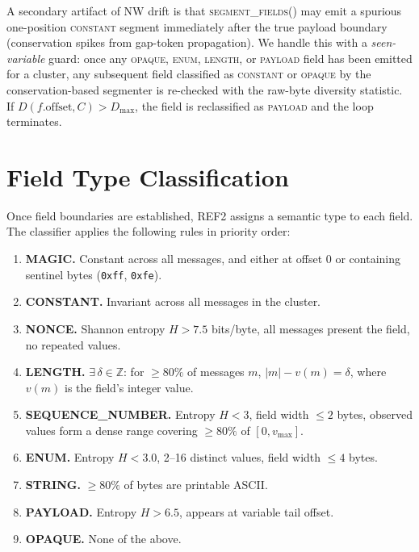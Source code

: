 \documentclass[letterpaper,twocolumn,10pt]{article}
\begin{document}
A secondary artifact of NW drift is that \textsc{segment\_fields()} may emit a
spurious one-position \textsc{constant} segment immediately after the true
payload boundary (conservation spikes from gap-token propagation).  We handle
this with a \emph{seen-variable} guard: once any \textsc{opaque},
\textsc{enum}, \textsc{length}, or \textsc{payload} field has been emitted for
a cluster, any subsequent field classified as \textsc{constant} or
\textsc{opaque} by the conservation-based segmenter is re-checked with the
raw-byte diversity statistic.  If $D(f.\text{offset}, C) > D_\text{max}$, the
field is reclassified as \textsc{payload} and the loop terminates.

\section{Field Type Classification}
\label{sec:classify}

Once field boundaries are established, \textsc{REF2} assigns a semantic type to
each field.  The classifier applies the following rules in priority order:

\begin{enumerate}
  \item \textbf{MAGIC.} Constant across all messages, and either at offset 0
    or containing sentinel bytes (\texttt{0xff}, \texttt{0xfe}).
  \item \textbf{CONSTANT.} Invariant across all messages in the cluster.
  \item \textbf{NONCE.} Shannon entropy $H > 7.5$ bits/byte, all messages
    present the field, no repeated values.
  \item \textbf{LENGTH.} $\exists\,\delta \in \mathbb{Z}$: for $\geq 80\%$ of
    messages $m$, $|m| - v(m) = \delta$, where $v(m)$ is the field's integer
    value.
  \item \textbf{SEQUENCE\_NUMBER.} Entropy $H < 3$, field width $\leq 2$ bytes,
    observed values form a dense range covering $\geq 80\%$ of $[0, v_\text{max}]$.
  \item \textbf{ENUM.} Entropy $H < 3.0$, 2--16 distinct values, field width
    $\leq 4$ bytes.
  \item \textbf{STRING.} $\geq 80\%$ of bytes are printable ASCII.
  \item \textbf{PAYLOAD.} Entropy $H > 6.5$, appears at variable tail offset.
  \item \textbf{OPAQUE.} None of the above.
\end{enumerate}
\end{document}
